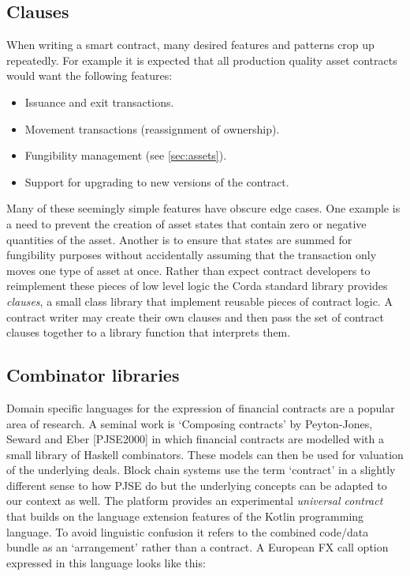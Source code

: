 \documentclass{article}
\begin{document}
\subsection{Clauses}
When writing a smart contract, many desired features and patterns crop up repeatedly. For example it is expected
that all production quality asset contracts would want the following features:

\begin{itemize}
\item Issuance and exit transactions.
\item Movement transactions (reassignment of ownership).
\item Fungibility management (see \cref{sec:assets}).
\item Support for upgrading to new versions of the contract.
\end{itemize}

Many of these seemingly simple features have obscure edge cases. One example is a need to prevent the creation of
asset states that contain zero or negative quantities of the asset. Another is to ensure that states are summed
for fungibility purposes without accidentally assuming that the transaction only moves one type of asset at once.
Rather than expect contract developers to reimplement these pieces of low level logic the Corda standard library
provides \emph{clauses}, a small class library that implement reusable pieces of contract logic. A contract writer
may create their own clauses and then pass the set of contract clauses together to a library function that
interprets them.

\subsection{Combinator libraries}

Domain specific languages for the expression of financial contracts are a popular area of research. A seminal work
is `Composing contracts' by Peyton-Jones, Seward and Eber [PJSE2000\cite{PeytonJones:2000:CCA:357766.351267}] in which
financial contracts are modelled with a small library of Haskell combinators. These models can then be used for
valuation of the underlying deals. Block chain systems use the term `contract' in a slightly different sense to
how PJSE do but the underlying concepts can be adapted to our context as well. The platform provides an
experimental \emph{universal contract} that builds on the language extension features of the Kotlin programming
language. To avoid linguistic confusion it refers to the combined code/data bundle as an `arrangement' rather
than a contract. A European FX call option expressed in this language looks like this:
\end{document}
